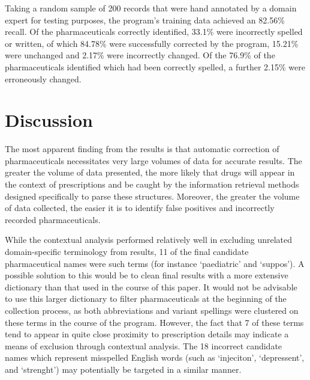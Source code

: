 Taking a random sample of 200 records that were hand annotated by a domain expert for testing purposes, the program's training data achieved an 82.56\% recall. Of the pharmaceuticals correctly identified, 33.1\% were incorrectly spelled or written, of which 84.78\% were successfully corrected by the program, 15.21\% were unchanged and 2.17\% were incorrectly changed. Of the 76.9\% of the pharmaceuticals identified which had been correctly spelled, a further 2.15\%  were erroneously changed.

\section{Discussion}

The most apparent finding from the results is that automatic correction of pharmaceuticals necessitates very large volumes of data for accurate results. The greater the volume of data presented, the more likely that drugs will appear in the context of prescriptions and be caught by the information retrieval methods designed specifically to parse these structures. Moreover, the greater the volume of data collected, the easier it is to identify false positives and incorrectly recorded pharmaceuticals. 

While the contextual analysis performed relatively well in excluding unrelated domain-specific terminology from results, 11 of the final candidate pharmaceutical names were such terms (for instance `paediatric' and `suppos'). A possible solution to this would be to clean final results with a more extensive dictionary than that used in the course of this paper. It would not be advisable to use this larger dictionary to filter pharmaceuticals at the beginning of the collection process, as both abbreviations and variant spellings were clustered on these terms in the course of the program. However, the fact that 7 of these terms tend to appear in quite close proximity to prescription details may indicate a means of exclusion through contextual analysis. The 18 incorrect candidate names which represent misspelled English words (such as `injeciton', `depressent', and `strenght') may potentially be targeted in a similar manner.


